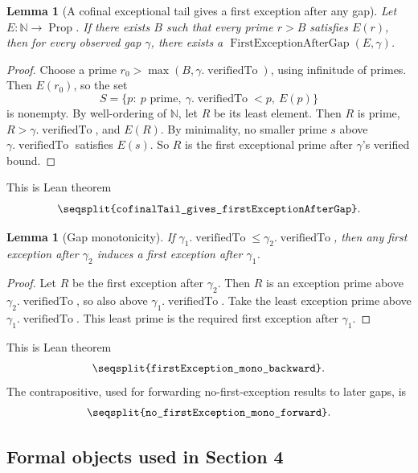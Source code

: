 \documentclass[11pt]{article}
\newtheorem{lemma}[theorem]{Lemma}
\newcommand{\Nat}{\mathbb{N}}
\newcommand{\Lean}[1]{\texttt{\seqsplit{#1}}}
\begin{document}
\begin{lemma}[A cofinal exceptional tail gives a first exception after any gap]
Let \(E:\Nat\to\operatorname{Prop}\).  If there exists \(B\) such that every
prime \(r>B\) satisfies \(E(r)\), then for every observed gap \(\gamma\), there
exists a \(\operatorname{FirstExceptionAfterGap}(E,\gamma)\).
\end{lemma}

\begin{proof}
Choose a prime \(r_0>\max(B,\gamma.\operatorname{verifiedTo})\), using
infinitude of primes.  Then \(E(r_0)\), so the set
\[
  S=\{p:\ p\text{ prime},\ \gamma.\operatorname{verifiedTo}<p,\ E(p)\}
\]
is nonempty.  By well-ordering of \(\Nat\), let \(R\) be its least element.
Then \(R\) is prime, \(R>\gamma.\operatorname{verifiedTo}\), and \(E(R)\).  By
minimality, no smaller prime \(s\) above \(\gamma.\operatorname{verifiedTo}\)
satisfies \(E(s)\).  So \(R\) is the first exceptional prime after
\(\gamma\)'s verified bound.
\end{proof}

This is Lean theorem
\[
  \Lean{cofinalTail\_gives\_firstExceptionAfterGap}.
\]

\begin{lemma}[Gap monotonicity]
If \(\gamma_1.\operatorname{verifiedTo}\le
\gamma_2.\operatorname{verifiedTo}\), then any first exception after
\(\gamma_2\) induces a first exception after \(\gamma_1\).
\end{lemma}

\begin{proof}
Let \(R\) be the first exception after \(\gamma_2\).  Then \(R\) is an
exception
prime above \(\gamma_2.\operatorname{verifiedTo}\), so also above
\(\gamma_1.\operatorname{verifiedTo}\).  Take the least exception prime above
\(\gamma_1.\operatorname{verifiedTo}\).  This least prime is the required
first exception after \(\gamma_1\).
\end{proof}

This is Lean theorem
\[
  \Lean{firstException\_mono\_backward}.
\]
The contrapositive, used for forwarding no-first-exception results to later
gaps, is
\[
  \Lean{no\_firstException\_mono\_forward}.
\]

\subsection{Formal objects used in Section 4}
\end{document}
